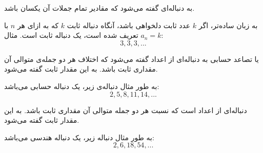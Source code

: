 
\begin{DEFINITION}
  \p
  به دنباله‌ای گفته می‌شود که مقادیر تمام جملات آن یکسان باشد.
\end{DEFINITION}

\p
به زبان ساده‌تر، اگر
$k$
عدد ثابت دلخواهی باشد، آنگاه دنباله ثابت 
$k$
که به ازای هر 
$n$
با 
$a_n = k$
تعریف شده است، 
یک دنباله ثابت است.
مثال:
$$3, 3, 3, ...$$

\begin{DEFINITION}
    \p
    یا تصاعد حسابی به دنباله‌ای از اعداد گفته می‌شود که اختلاف هر دو جمله‌ی متوالی آن مقداری ثابت باشد. به این مقدار ثابت 
      گفته می‌شود.
\end{DEFINITION}
	\p
به طور مثال دنباله‌ی زیر، یک دنباله‌ حسابی می‌باشد:
$$2, 5, 8, 11, 14, ...$$





\begin{DEFINITION}
    \p
   دنباله‌ای از اعداد است که نسبت هر دو جمله متوالی آن مقداری ثابت باشد. به این مقدار ثابت 
  گفته می‌شود.    
\end{DEFINITION}
	\p
به طور مثال دنباله زیر، یک دنباله هندسی می‌باشد:
$$2, 6, 18, 54, ...$$




